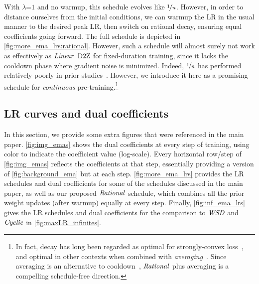 With $\lambda$=$1$ and no warmup, this schedule evolves like
$\nicefrac{1}{n}$.  However, in order to distance ourselves from the
initial conditions, we can warmup the LR in the usual manner to the
desired peak LR, then switch on rational decay, ensuring equal
coefficients going forward.  The full schedule is depicted in
\cref{fig:more_ema_lrs:rational}.
%
However, such a schedule will almost surely not work as effectively as
$\mbox{\emph{Linear}}$ $\mbox{D2Z}$ for fixed-duration training, since it lacks the
cooldown phase where gradient noise is minimized.  Indeed,
$\nicefrac{1}{n}$ has performed relatively poorly in prior
studies~\citep{ge2019step,defazio2023when}.
%
However, we introduce it here as a promising schedule for
\emph{continuous} pre-training.\footnote{In fact, 
decay has long been regarded as optimal for strongly-convex
loss~\citep{robbins1951stochastic}, and optimal in other contexts when
combined with \emph{averaging}~\citep{defazio2023when}.  Since
averaging is an alternative to cooldown~\citep{hagele2024scaling},
$\mbox{\emph{Rational}}$ plus averaging is a compelling schedule-free direction.}
%


\subsection{LR curves and dual coefficients}







In this section, we provide some extra figures that were referenced in
the main paper.  \cref{fig:img_emas} shows the dual coefficients
at every step of training, using color to indicate the coefficient
value (log-scale).  Every horizontal row/step of
\cref{fig:img_emas} reflects the coefficients at that step,
essentially providing a version of \cref{fig:background_ema} but
at each step.
%
\cref{fig:more_ema_lrs} provides the LR schedules and dual
coefficients for some of the schedules discussed in the main paper, as
well as our proposed $\mbox{\emph{Rational}}$ schedule, which combines all the
prior weight updates (after warmup) equally at every step.
%
Finally, \cref{fig:inf_ema_lrs} gives the LR schedules and dual
coefficients for the comparison to $\mbox{\emph{WSD}}$ and $\mbox{\emph{Cyclic}}$ in
\cref{fig:maxLR_infinites}.

